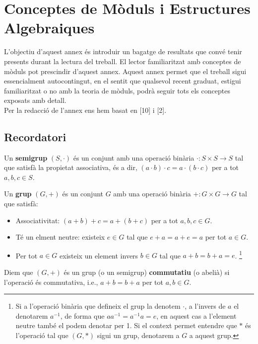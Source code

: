 
\chapter{Conceptes de Mòduls i Estructures Algebraiques} %

\label{AppendixA} %


L'objectiu d'aquest annex és introduir un bagatge de resultats que convé tenir presents durant la lectura del treball. El lector familiaritzat amb conceptes de mòduls pot prescindir d'aquest annex. Aquest annex permet que el treball sigui essencialment autocontingut, en el sentit que qualsevol recent graduat, estigui familiaritzat o no amb la teoria de mòduls, podrà seguir tots els conceptes exposats amb detall.\\
\indent Per la redacció de l'annex ens hem basat en [10] i [2]. 
\label{Chapter1} %

\section{Recordatori}
\begin{definition}
Un \textbf{semigrup} $(S, \cdot )$ és un conjunt amb una operació binària $\cdot : S\times S \rightarrow S$ tal que satisfà la propietat associativa, és a dir, $(a \cdot b) \cdot c = a \cdot (b \cdot c)$ per a tot $a,b,c\in S$.
\end{definition}

\begin{definition}
 Un \textbf{grup} $(G,+)$ és un conjunt $G$ amb una operació binària $+: G\times G \rightarrow G$ tal que satisfà:
\begin{itemize}
\item Associativitat: $(a+b)+c = a+(b+c)$ per a tot $a,b,c\in G$.
\item Té un elment neutre: existeix $e\in G$ tal que $e+a=a+e=a$ per tot $a\in G$.
\item Per tot $a\in G$ existeix un element invers $b\in G$ tal que $a+b=b+a=e$. \footnote{Si a l'operació binària que defineix el grup la denotem $\cdot$, a l'invers de $a$ el denotarem $a^{-1}$, de forma que $aa^{-1} = a^{-1}a = e$, en aquest cas a l'element neutre també el podem denotar per 1. Si el context permet entendre que $*$ és l'operació tal que $(G,*)$ sigui un grup, denotarem a $G$ a aquest grup. }
\end{itemize}
Diem que $(G,+)$ és un grup (o un semigrup) \textbf{commutatiu} (o abelià) si l'operació és commutativa, i.e., $a+b=b+a$ per tot $a, b\in G$. 
\end{definition}

